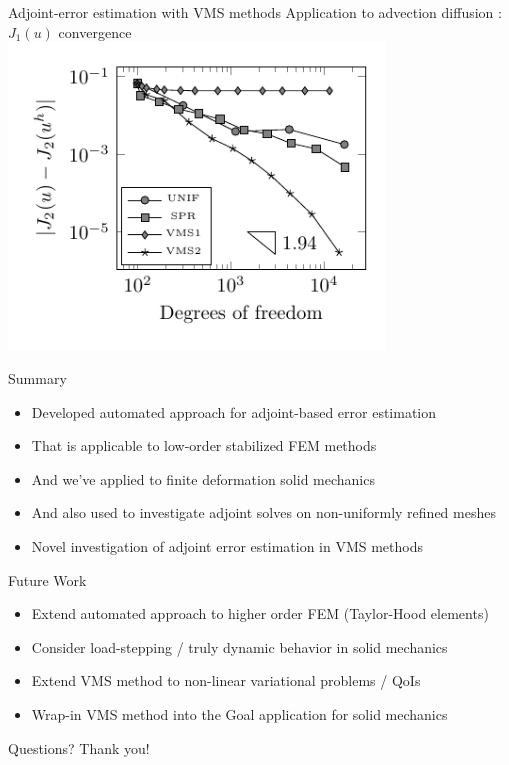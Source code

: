 \documentclass[fleqn]{beamer}
\begin{document}

\begin{frame}{Adjoint-error estimation with VMS methods}
{Application to advection diffusion : $J_1(u)$ convergence}
\includegraphics[width=0.75\textwidth]{../img/vms_lshape_square_convergence}
\end{frame}


\begin{frame}{Summary}
\begin{itemize}
\item Developed automated approach for adjoint-based error estimation
\item That is applicable to low-order stabilized FEM methods
\item And we've applied to finite deformation solid mechanics
\item And also used to investigate adjoint solves on non-uniformly refined meshes
\item Novel investigation of adjoint error estimation in VMS methods
\end{itemize}
\end{frame}


\begin{frame}{Future Work}
\begin{itemize}
\item Extend automated approach to higher order FEM (Taylor-Hood elements)
\item Consider load-stepping / truly dynamic behavior in solid mechanics
\item Extend VMS method to non-linear variational problems / QoIs
\item Wrap-in VMS method into the Goal application for solid mechanics
\end{itemize}
\end{frame}


\begin{frame}
\centering
Questions?
Thank you!
\end{frame}
\end{document}
